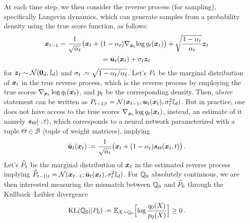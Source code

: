 At each time step, we then consider the reverse process (for sampling), specifically Langevin dynamics, which can generate samples from a probability density using the true score function, as follows:
\begin{multline*}
    \textcolor{black}{\boldsymbol{x}}_{t-1}=\frac{1}{\sqrt{\alpha_t}}\bigl(\textcolor{black}{\boldsymbol{x}}_t+(1-\alpha_t)\nabla_{\textcolor{black}{\boldsymbol{x}}_t}\!\log q_t(\textcolor{black}{\boldsymbol{x}}_t)\bigr)+\sqrt{\frac{1-\alpha_t}{\alpha_t}}\boldsymbol{z}_t\\
    =\boldsymbol{u}_t(\textcolor{black}{\boldsymbol{x}}_t)+\sigma_t
\boldsymbol{z}_t
\end{multline*}
for $\boldsymbol{z}_t\sim \mathcal{N}(\boldsymbol{0}_{\textcolor{black}{d}},\textcolor{black}{\mathbb{I}_{\textcolor{black}{d}}})$ and $\sigma_t\deq \sqrt{1-\alpha_t/\alpha_t}$.
Let's $P_t$ be the marginal distribution of $\textcolor{black}{\boldsymbol{x}}_t$ in the true reverse process, which is the reverse process by employing the true scores $\nabla_{\textcolor{black}{\boldsymbol{x}}_t}\log q_t(\textcolor{black}{\boldsymbol{x}}_t)$,  and $p_t$ be the corresponding density. 
Then, above statement can be written as 
$P_{t-1|t}=\mathcal{N}(\textcolor{black}{\boldsymbol{x}}_{t-1};\boldsymbol{u}_t(\textcolor{black}{\boldsymbol{x}}_t),\sigma_t^2\textcolor{black}{\mathbb{I}_{\textcolor{black}{d}}})$.
But in practice, one does not have access to the true scores $\nabla_{\textcolor{black}{\boldsymbol{x}}_t} \log q_t(\textcolor{black}{\boldsymbol{x}}_t)$, 
instead, an estimate of it namely $\textcolor{black}{\textcolor{black}{\boldsymbol{s}}_{\textcolor{black}{\Theta}}}(\cdot,t)$, which corresponds to a neural network parameterized with a tuple  $\Theta\in \mathcal{B}$ (tuple of weight matrices),  implying  
\begin{equation*}\label{eq:uhat}
 \uth(\x_t)\deq\frac{1}{\sqrt{\alpha_t}}\bigl(\x_t+(1-\alpha_t)\scoref(\x_t,t)\bigr)\,.
\end{equation*}
Let's $\widehat{P}_t$ be the marginal distribution of $\textcolor{black}{\boldsymbol{x}}_t$ in the estimated reverse process implying $\widehat{P}_{t-1|t}=\mathcal{N}(\textcolor{black}{\boldsymbol{x}}_{t-1};\hat{\boldsymbol{u}}_t(\textcolor{black}{\boldsymbol{x}}_t),\sigma_t^2\textcolor{black}{\mathbb{I}_{\textcolor{black}{d}}})$.
For $\mathbb{Q}_0$   absolutely continuous, we are then interested measuring the mismatch between $\mathbb{Q}_0$ and $\widehat{P}_0$ through the
Kullback–Leibler divergence
\begin{equation*}
 \KL(\Fd_0 ||\Bd_0)\deq  \E_{X\sim \Fd_0} \Bigl[\log\frac{\Fdd_0(X)}{\Bdd_0(X)}\Bigr] \ge 0\,. 
\end{equation*}


	


